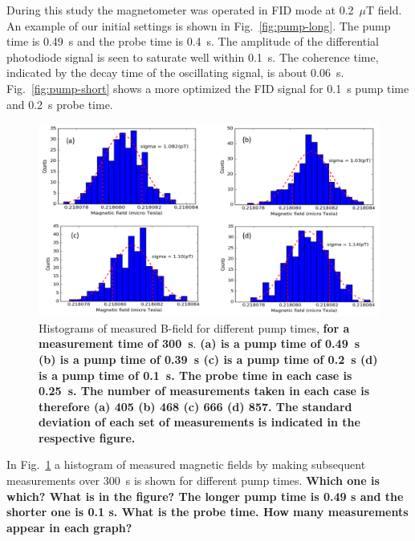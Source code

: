 During this study the magnetometer was operated in FID mode at
0.2~$\mu$T field.
An example of our initial settings is shown in
Fig.~\ref{fig:pump-long}.  The pump time is 0.49~s and the probe time
is 0.4~s.  The amplitude of the differential photodiode signal is seen
to saturate well within 0.1~s.  The coherence time, indicated by the
decay time of the oscillating signal, is about 0.06~s.
Fig.~\ref{fig:pump-short} shows a more optimized the FID signal for
0.1~s pump time and 0.2~s probe time.

\begin{figure}%
  \centering\includegraphics[width=0.75\linewidth]{figures/pump_time}
  \caption{Histograms of measured B-field for different pump times,
    {\bf for a measurement time of 300~s}. {\bf (a) is a pump time of
      0.49~s (b) is a pump time of 0.39~s (c) is a pump time of 0.2~s (d) is a
      pump time of 0.1~s.  The probe time in each case is 0.25~s.  The number
      of measurements taken in each case is therefore (a) 405 (b) 468
      (c) 666 (d) 857.  The standard deviation of each set of
      measurements is indicated in the respective
      figure.}\label{fig:different-pump-time}}
\end{figure}

In Fig.~\ref{fig:different-pump-time} a histogram of measured magnetic
fields by making subsequent measurements over 300~s is shown for
different pump times.  {\bf Which one is which? What is in the figure?
  The longer pump time is 0.49 s and the shorter one is 0.1 s.  What
  is the probe time.  How many measurements appear in each graph?}

